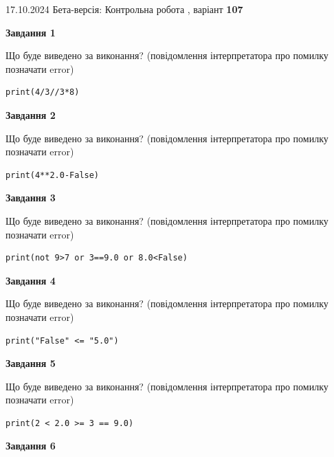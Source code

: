 \documentclass[12pt, ukrainian]{article}
\begin{document}
{\Large{17.10.2024 Бета-версія: Контрольна робота , варіант  \No \textbf { 107 }\par}}
{
\begin {large}
{\begin {center}\textbf{Завдання 1}\end {center}}

Що буде виведено за виконання? (повідомлення інтерпретатора про помилку позначати error)\par
\begin{verbatim}
print(4/3//3*8)
\end{verbatim}

{\begin {center}\textbf{Завдання 2}\end {center}}

Що буде виведено за виконання? (повідомлення інтерпретатора про помилку позначати error)\par
\begin{verbatim}
print(4**2.0-False)
\end{verbatim}

{\begin {center}\textbf{Завдання 3}\end {center}}

Що буде виведено за виконання? (повідомлення інтерпретатора про помилку позначати error)\par
\begin{verbatim}
print(not 9>7 or 3==9.0 or 8.0<False)
\end{verbatim}

{\begin {center}\textbf{Завдання 4}\end {center}}

Що буде виведено за виконання? (повідомлення інтерпретатора про помилку позначати error)\par
\begin{verbatim}
print("False" <= "5.0")
\end{verbatim}

{\begin {center}\textbf{Завдання 5}\end {center}}

Що буде виведено за виконання? (повідомлення інтерпретатора про помилку позначати error)\par
\begin{verbatim}
print(2 < 2.0 >= 3 == 9.0)
\end{verbatim}

{\begin {center}\textbf{Завдання 6}\end {center}}


\end{large}}
\end{document}
